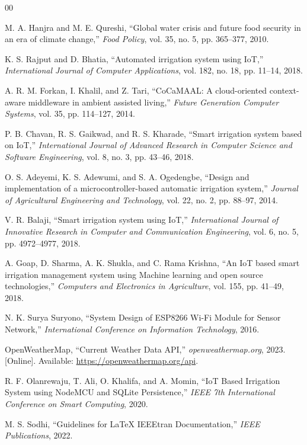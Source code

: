 \documentclass[conference]{IEEEtran}
\begin{document}
\begin{thebibliography}{00}

 M. A. Hanjra and M. E. Qureshi, ``Global water crisis and future food security in an era of climate change,'' \textit{Food Policy}, vol. 35, no. 5, pp. 365--377, 2010.

 K. S. Rajput and D. Bhatia, ``Automated irrigation system using IoT,'' \textit{International Journal of Computer Applications}, vol. 182, no. 18, pp. 11--14, 2018.

 A. R. M. Forkan, I. Khalil, and Z. Tari, ``CoCaMAAL: A cloud-oriented context-aware middleware in ambient assisted living,'' \textit{Future Generation Computer Systems}, vol. 35, pp. 114--127, 2014.

 P. B. Chavan, R. S. Gaikwad, and R. S. Kharade, ``Smart irrigation system based on IoT,'' \textit{International Journal of Advanced Research in Computer Science and Software Engineering}, vol. 8, no. 3, pp. 43--46, 2018.

 O. S. Adeyemi, K. S. Adewumi, and S. A. Ogedengbe, ``Design and implementation of a microcontroller-based automatic irrigation system,'' \textit{Journal of Agricultural Engineering and Technology}, vol. 22, no. 2, pp. 88--97, 2014.

 V. R. Balaji, ``Smart irrigation system using IoT,'' \textit{International Journal of Innovative Research in Computer and Communication Engineering}, vol. 6, no. 5, pp. 4972--4977, 2018.

 A. Goap, D. Sharma, A. K. Shukla, and C. Rama Krishna, ``An IoT based smart irrigation management system using Machine learning and open source technologies,'' \textit{Computers and Electronics in Agriculture}, vol. 155, pp. 41--49, 2018.

 N. K. Surya Suryono, ``System Design of ESP8266 Wi-Fi Module for Sensor Network,'' \textit{International Conference on Information Technology}, 2016.

 OpenWeatherMap, ``Current Weather Data API,'' \textit{openweathermap.org}, 2023. [Online]. Available: \url{https://openweathermap.org/api}.

 R. F. Olanrewaju, T. Ali, O. Khalifa, and A. Momin, ``IoT Based Irrigation System using NodeMCU and SQLite Persistence,'' \textit{IEEE 7th International Conference on Smart Computing}, 2020.

 M. S. Sodhi, ``Guidelines for LaTeX IEEEtran Documentation,'' \textit{IEEE Publications}, 2022.

\end{thebibliography}
\end{document}

